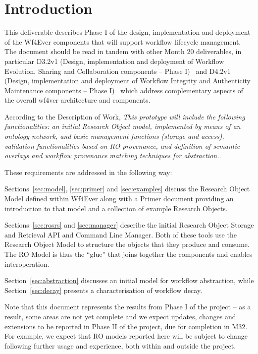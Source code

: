 \section{Introduction}

This deliverable describes Phase I of the design, implementation and
deployment of the Wf4Ever components that will support workflow
lifecycle management. The document should be read in tandem with other
Month 20 deliverables, in particular D3.2v1 (Design, implementation
and deployment of Workflow Evolution, Sharing and Collaboration
components -- Phase I)~\cite{D3.2v1} and D4.2v1 (Design,
implementation and deployment of Workflow Integrity and Authenticity
Maintenance components -- Phase I)~\cite{D4.2v1} which address
complementary aspects of the overall wf4ver architecture and
components.

According to the Description of Work, \emph{This prototype will
  include the following functionalities: an initial Research Object
  model, implemented by means of an ontology network, and basic
  management functions (storage and access), validation
  functionalities based on RO provenance, and definition of semantic
  overlays and workflow provenance matching techniques for
  abstraction.}. 

These requirements are addressed in the following way:

Sections~\ref{sec:model}, \ref{sec:primer} and \ref{sec:examples}
discuss the Research Object Model defined within Wf4Ever along with a
Primer document providing an introduction to that model and a
collection of example Research Objects. 

Sections~\ref{sec:rosrs} and \ref{sec:manager} describe the initial
Research Object Storage and Retrieval API and Command Line
Manager. Both of these tools use the Research Object Model to
structure the objects that they produce and consume. The RO Model is
thus the ``glue'' that joins together the components and enables
interoperation. 

Section~\ref{sec:abstraction} discusses an initial model for workflow
abstraction, while Section~\ref{sec:decay} presents a characterisation
of workflow decay. 

Note that this document represents the results from Phase I of the
project -- as a result, some areas are not yet complete and we expect
updates, changes and extensions to be reported in Phase II of the
project, due for completion in M32. For example, we expect that RO models reported
here will be subject to change following further usage and experience,
both within and outside the project.